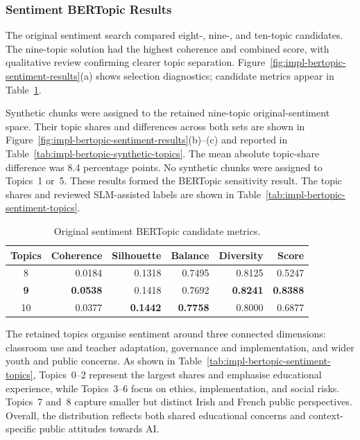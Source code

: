 \subsubsection*{Sentiment BERTopic Results}

The original sentiment search compared eight-, nine-, and ten-topic candidates. The
nine-topic solution had the highest coherence and combined score, with qualitative
review confirming clearer topic separation.
Figure~\ref{fig:impl-bertopic-sentiment-results}(a) shows selection diagnostics;
candidate metrics appear in Table~\ref{tab:impl-bertopic-sentiment-candidates}.

Synthetic chunks were assigned to the retained nine-topic original-sentiment space.
Their topic shares and differences across both sets are shown in
Figure~\ref{fig:impl-bertopic-sentiment-results}(b)--(c) and reported in
Table~\ref{tab:impl-bertopic-synthetic-topics}. The mean absolute topic-share
difference was 8.4 percentage points. No synthetic chunks were assigned to Topics~1
or~5. These results formed the BERTopic sensitivity result. The topic shares and
reviewed SLM-assisted labels are shown in
Table~\ref{tab:impl-bertopic-sentiment-topics}.

\begin{table}[ht]
\centering
\small
\setlength{\tabcolsep}{4pt}
\begin{tabular}{crrrrr}
\hline
Topics & Coherence & Silhouette & Balance & Diversity & Score \\
\hline
8 & 0.0184 & 0.1318 & 0.7495 & 0.8125 & 0.5247 \\
\textbf{9} & \textbf{0.0538} & 0.1418 & 0.7692 & \textbf{0.8241} &
\textbf{0.8388} \\
10 & 0.0377 & \textbf{0.1442} & \textbf{0.7758} & 0.8000 & 0.6877 \\
\hline
\end{tabular}
\caption{Original sentiment BERTopic candidate metrics.}
\label{tab:impl-bertopic-sentiment-candidates}
\end{table}

The retained topics organise sentiment around three connected dimensions: classroom
use and teacher adaptation, governance and implementation, and wider youth and public
concerns. As shown in Table~\ref{tab:impl-bertopic-sentiment-topics}, Topics~0--2
represent the largest shares and emphasise educational experience, while Topics~3--6
focus on ethics, implementation, and social risks. Topics~7 and~8 capture smaller but
distinct Irish and French public perspectives. Overall, the distribution reflects
both shared educational concerns and context-specific public attitudes towards AI.


